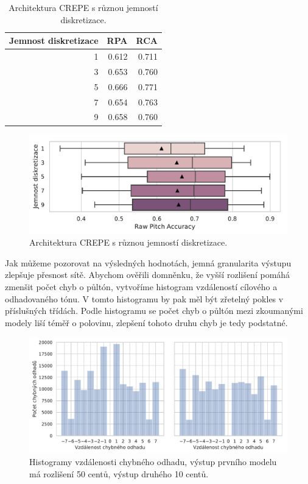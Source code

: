 \begin{table}[h!]

\centering
    \begin{tabular}{rrr}
    \toprule
    Jemnost diskretizace &   RPA &   RCA \\
    \midrule
                    1 & 0.612 & 0.711 \\
                    3 & 0.653 & 0.760 \\
                    5 & 0.666 & 0.771 \\
                    7 & 0.654 & 0.763 \\
                    9 & 0.658 & 0.760 \\
    \bottomrule
    \end{tabular}

\caption{Architektura CREPE s různou jemností diskretizace.}\label{tab:crepe_diskretizace}

\end{table}

\begin{figure}[h]\centering
    \includegraphics[scale=0.6]{../img/figures/crepe_diskretizace.pdf}
\caption{Architektura CREPE s různou jemností diskretizace.}\label{obr:crepe_diskretizace}
\end{figure}

Jak můžeme pozorovat na výsledných hodnotách, jemná granularita výstupu zlepšuje přesnost sítě. Abychom ověřili domněnku, že vyšší rozlišení pomáhá zmenšit počet chyb o půltón, vytvoříme histogram vzdáleností cílového a odhadovaného tónu. V tomto histogramu by pak měl být zřetelný pokles v příslušných třídách. Podle histogramu se počet chyb o půltón mezi zkoumanými modely liší téměř o polovinu, zlepšení tohoto druhu chyb je tedy podstatné.

\begin{figure}[h]\centering
    \includegraphics[scale=0.6]{../img/figures/crepe_diskretizace_hist.pdf}
\caption{Histogramy vzdálenosti chybného odhadu, výstup prvního modelu má rozlišení 50 centů, výstup druhého 10 centů.}\label{obr:crepe_diskretizace}
\end{figure}

